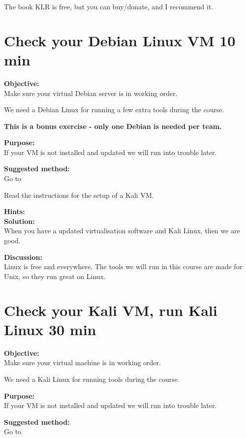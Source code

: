 \documentclass[a4paper,11pt,notitlepage]{report}
\begin{document}
The book KLR is free, but you can buy/donate, and I recommend it.



\chapter{Check your Debian Linux VM 10 min}
\label{ex:sw-basicDebianVM}


{\bf Objective:}\\
Make sure your virtual Debian server is in working order.

We need a Debian Linux for running a few extra tools during the course.

{\Large \bf This is a bonus exercise - only one Debian is needed per team.}

{\bf Purpose:}\\
If your VM is not installed and updated we will run into trouble later.

{\bf Suggested method:}\\
Go to 

Read the instructions for the setup of a Kali VM.

{\bf Hints:}\\

{\bf Solution:}\\
When you have a updated virtualisation software and Kali Linux, then we are good.

{\bf Discussion:}\\
Linux is free and everywhere. The tools we will run in this course are made for Unix, so they run great on Linux.


\chapter{Check your Kali VM, run Kali Linux 30 min}
\label{ex:sw-basicVM}


{\bf Objective:}\\
Make sure your virtual machine is in working order.

We need a Kali Linux for running tools during the course.

{\bf Purpose:}\\
If your VM is not installed and updated we will run into trouble later.

{\bf Suggested method:}\\
Go to 
\end{document}
